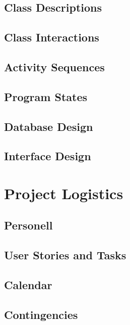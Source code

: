 \documentclass[12pt]{article}
\begin{document}
\subsection{Class Descriptions}


\subsection{Class Interactions}


\subsection{Activity Sequences}


\subsection{Program States}


\subsection{Database Design}


\subsection{Interface Design}




\section{Project Logistics}

\subsection{Personell}


\subsection{User Stories and Tasks}


\subsection{Calendar}


\subsection{Contingencies}

\end{document}

